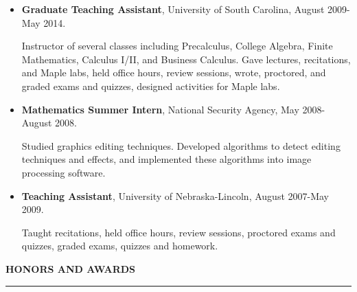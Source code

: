 \documentclass{article}
\begin{document}
\begin{itemize}
		\item \textbf{Graduate Teaching Assistant}, University of South Carolina, August 2009-May 2014.

		Instructor of several classes including Precalculus, College Algebra, Finite Mathematics, Calculus I/II, and Business Calculus.
		Gave lectures, recitations, and Maple labs, held office hours, review sessions, wrote, proctored, and graded exams and quizzes, designed activities for Maple labs.
	

		\item \textbf{Mathematics Summer Intern}, National Security Agency, May 2008-August 2008.

		Studied graphics editing techniques.  
		Developed algorithms to detect editing techniques and effects, and implemented these algorithms into image processing software.


		\item \textbf{Teaching Assistant}, University of Nebraska-Lincoln, August 2007-May 2009.

		Taught recitations, held office hours, review sessions, proctored exams and quizzes, graded exams, quizzes and homework.
		

	\end{itemize}

\vspace{.25 in}


\LARGE \textbf{HONORS AND AWARDS}\normalsize

\noindent \rule{\textwidth}{1px}
	
\end{document}
